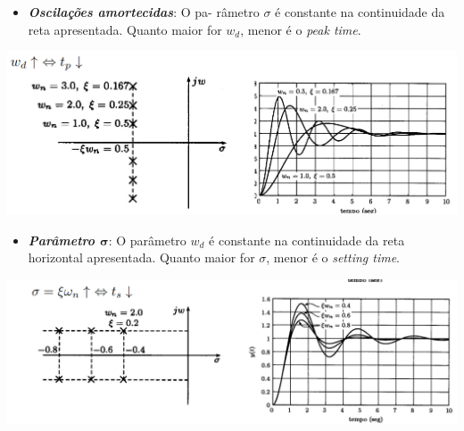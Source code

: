 \begin{center}
    \begin{minipage}{0.45\textwidth}
        \begin{itemize}[leftmargin=*]
        \item[] \textbf{\emph{Oscilações amortecidas}}: O pa- râmetro $\sigma$ é constante na continuidade da reta apresentada. Quanto maior for $w_d$, menor é o \textit{peak time}.
        \end{itemize}
    \end{minipage}%
    \hfill
    \begin{minipage}{0.55\textwidth}
        \begin{center}
            \includegraphics[width=1\textwidth]{img/2/peak-time.png}
            \label{img:peak-t}
        \end{center}
    \end{minipage}
\end{center}

\begin{center}
    \begin{minipage}{0.45\textwidth}
        \begin{itemize}[leftmargin=*]
        \item[] \textbf{\emph{Parâmetro $\mathbf{\sigma}$}}: O parâmetro $w_d$ é constante na continuidade da reta horizontal apresentada. Quanto maior for $\sigma$, menor é o \textit{setting time}.
        \end{itemize}
    \end{minipage}%
    \hfill
    \begin{minipage}{0.55\textwidth}
        \begin{center}
            \includegraphics[width=1\textwidth]{img/2/setting-time.png}
            \label{img:set-time}
        \end{center}
    \end{minipage}
\end{center}

